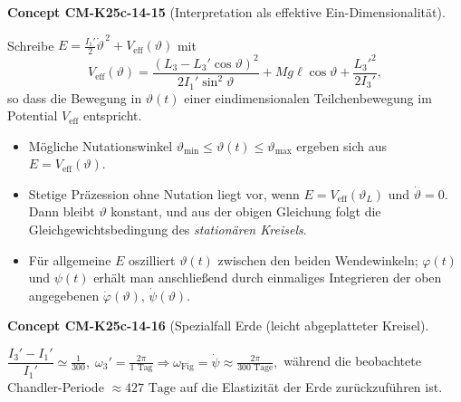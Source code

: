 \documentclass[10pt, letterpaper]{article}
\newcommand{\CustomHeading}[3]{%
  \par\medskip\noindent%
  \textbf{#1 #2} \textnormal{(#3)}.\enskip%
}
\newenvironment{CONC}[2]{\CustomHeading{Concept}{#1}{#2}}{}
\begin{document}
\begin{CONC}{CM-K25c-14-15}{Interpretation als effektive Ein-Dimensionalität}
Schreibe $E= \tfrac{I_1'}{2}\dot\vartheta^{\,2}+V_{\text{eff}}(\vartheta)$ mit
\[
V_{\text{eff}}(\vartheta)=
  \frac{(L_3-L_3'\cos\vartheta)^{2}}{2I_1'\sin^{2}\vartheta}
  +Mg\ell\cos\vartheta+\frac{L_3'^{2}}{2I_3'} ,
\]
so dass die Bewegung in $\vartheta(t)$ einer eindimensionalen Teilchenbewegung im Potential $V_{\text{eff}}$ entspricht.  
\begin{itemize}
\item Mögliche Nutationswinkel $\vartheta_{\min}\le\vartheta(t)\le\vartheta_{\max}$ ergeben sich aus \(E=V_{\text{eff}}(\vartheta)\).
\item Stetige Präzession ohne Nutation liegt vor, wenn $E=V_{\text{eff}}(\vartheta_L)$ und $\dot\vartheta=0$. Dann bleibt $\vartheta$ konstant, und aus der obigen Gleichung folgt die Gleichgewichtsbedingung des \emph{stationären Kreisels}.
\item Für allgemeine $E$ oszilliert $\vartheta(t)$ zwischen den beiden Wendewinkeln; $\varphi(t)$ und $\psi(t)$ erhält man anschließend durch einmaliges Integrieren der oben angegebenen $\dot\varphi(\vartheta)$, $\dot\psi(\vartheta)$.
\end{itemize}
\end{CONC}

\begin{CONC}{CM-K25c-14-16}{Spezialfall Erde (leicht abgeplatteter Kreisel}
\(
\dfrac{I_3'-I_1'}{I_1'}\simeq \tfrac1{300},\;
\omega_3'=\tfrac{2\pi}{1\text{ Tag}}
\Longrightarrow
\omega_{\text{Fig}}=\dot\psi\approx \tfrac{2\pi}{300\text{ Tage}},
\)
während die beobachtete Chandler-Periode \( \approx 427\text{ Tage} \)
auf die Elastizität der Erde zurückzuführen ist.
\end{CONC}
\end{document}
